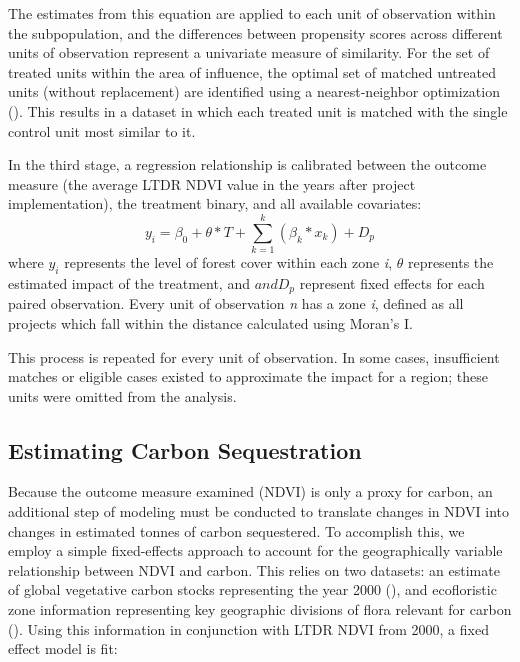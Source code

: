 \documentclass{article}\usepackage[]{graphicx}\usepackage[]{color}
\newenvironment{knitrout}{}{}  %
\begin{document}
\begin{knitrout}
The estimates from this equation are applied to each unit of observation within the subpopulation, and the differences between propensity scores across different units of observation represent a univariate measure of similarity.  
For the set of treated units within the area of influence, the optimal set of matched untreated units (without replacement) are identified using a nearest-neighbor optimization (\cite{ho_matchit:_2011}). 
This results in a dataset in which each treated unit is matched with the single control unit most similar to it.
\par
In the third stage, a regression relationship is calibrated between the outcome measure (the average LTDR NDVI value in the years after project implementation), the treatment binary, and all available covariates:
\begin{equation}
y_i = \beta_{0} + \theta * T + \sum_{k=1}^{k}(\beta_{k}*x_{k}) + D_{p}
\label{EQgwr}
\end{equation}
where \begin{math}y_{i}\end{math} represents the level of forest cover within each zone \textit{i}, \begin{math}\theta\end{math} represents the estimated impact of the treatment, and \begin{math}and D_{p}\end{math} represent fixed effects for each paired observation.
Every unit of observation \textit{n} has a zone \textit{i}, defined as all projects which fall within the distance calculated using Moran's I.
\par
This process is repeated for every unit of observation.  
In some cases, insufficient matches or eligible cases existed to approximate the impact for a region; these units were omitted from the analysis.

\subsection{Estimating Carbon Sequestration}
Because the outcome measure examined (NDVI) is only a proxy for carbon, an additional step of modeling must be conducted to translate changes in NDVI into changes in estimated tonnes of carbon sequestered.
To accomplish this, we employ a simple fixed-effects approach to account for the geographically variable relationship between NDVI and carbon.
This relies on two datasets: an estimate of global vegetative carbon stocks representing the year 2000 (\cite{saatchi_benchmark_2011}), and ecofloristic zone information representing key geographic divisions of flora relevant for carbon (\cite{ruesch_new_2008}).
Using this information in conjunction with LTDR NDVI from 2000, a fixed effect model is fit:


\end{knitrout}
\end{document}
